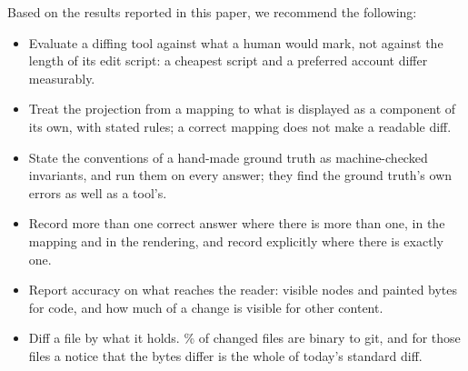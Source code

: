 \documentclass[sigconf,review]{acmart}
\begin{document}
Based on the results reported in this paper, we recommend the following:

\begin{itemize}
  \item Evaluate a diffing tool against what a human would mark, not against the length of its
    edit script: a cheapest script and a preferred account differ measurably.
  \item Treat the projection from a mapping to what is displayed as a component of its own, with
    stated rules; a correct mapping does not make a readable diff.
  \item State the conventions of a hand-made ground truth as machine-checked invariants, and run
    them on every answer; they find the ground truth's own errors as well as a tool's.
  \item Record more than one correct answer where there is more than one, in the mapping and in
    the rendering, and record explicitly where there is exactly one.
  \item Report accuracy on what reaches the reader: visible nodes and painted bytes for code, and
    how much of a change is visible for other content.
  \item Diff a file by what it holds. \ChangeCensusBinaryPct{}\% of changed files are binary
    to git, and for those files a notice that the bytes differ is the whole of today's standard
    diff.
\end{itemize}



\end{document}
